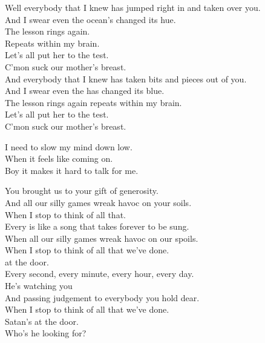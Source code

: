 Well everybody that I knew has jumped right in and taken over you. \\
And I swear even the ocean's changed its hue. \\
The lesson rings again. \\
Repeats within my brain. \\
Let's all put her to the test. \\
C'mon suck our mother's breast. \\

And everybody that I knew has taken bits and pieces out of you. \\
And I swear even the  has changed its blue. \\
The lesson rings again repeats within my brain. \\
Let's all put her to the test. \\
C'mon suck our mother's breast. \\




I need to slow my mind down low. \\

When it feels like coming on. \\
Boy it makes it hard to talk for me. \\




You brought us to your gift of generosity. \\
And all our silly games wreak havoc on your soils. \\
When I stop to think of all that. \\

Every  is like a song that takes forever to be sung. \\
When all our silly games wreak havoc on our spoils. \\
When I stop to think of all that we've done. \\
 at the door. \\

Every second, every minute, every hour, every day. \\
He's watching you \\
And passing judgement to everybody you hold dear. \\
When I stop to think of all that we've done. \\
Satan's at the door. \\
Who's he looking for? \\

